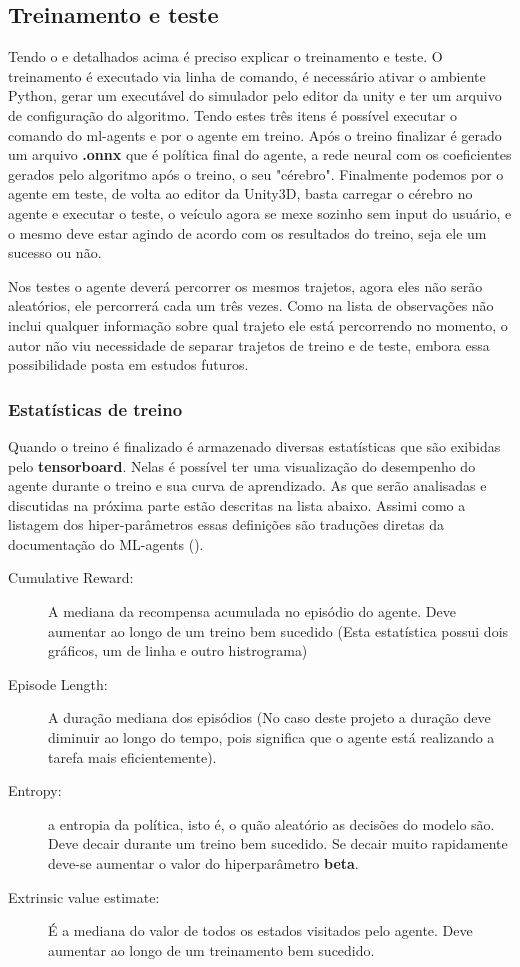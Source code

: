 \subsection{Treinamento e teste}
Tendo o  e  detalhados acima é preciso explicar o treinamento e teste. O treinamento é executado via linha de comando, é necessário ativar o ambiente Python, gerar um executável do simulador pelo editor da unity e ter um arquivo de configuração do algoritmo. Tendo estes três itens é possível executar o comando do ml-agents e por o agente em treino. Após o treino finalizar é gerado um arquivo \textbf{.onnx} que é política final do agente, a rede neural com os coeficientes gerados pelo algoritmo após o treino, o seu "cérebro". Finalmente podemos por o agente em teste, de volta ao editor da Unity3D, basta carregar o cérebro no agente e executar o teste, o veículo agora se mexe sozinho sem input do usuário, e o mesmo deve estar agindo de acordo com os resultados do treino, seja ele um sucesso ou não.

Nos testes o agente deverá percorrer os mesmos trajetos, agora eles não serão aleatórios, ele percorrerá cada um três vezes. Como na lista de observações não inclui qualquer informação sobre qual trajeto ele está percorrendo no momento, o autor não viu necessidade de separar trajetos de treino e de teste, embora essa possibilidade posta em estudos futuros.

\subsubsection*{Estatísticas de treino}
Quando o treino é finalizado é armazenado diversas estatísticas que são exibidas pelo \textbf{tensorboard}. Nelas é possível ter uma visualização do desempenho do agente durante o treino e sua curva de aprendizado. As que serão analisadas e discutidas na próxima parte estão descritas na lista abaixo. Assimi como a listagem dos hiper-parâmetros essas definições são traduções diretas da documentação do ML-agents ().

\begin{description}
   \item [Cumulative Reward:] A mediana da recompensa acumulada no episódio do agente. Deve aumentar ao longo de um treino bem sucedido (Esta estatística possui dois gráficos, um de linha e outro histrograma)
   \item [Episode Length:] A duração mediana dos episódios (No caso deste projeto a duração deve diminuir ao longo do tempo, pois significa que o agente está realizando a tarefa mais eficientemente).
   \item [Entropy:] a entropia da política, isto é, o quão aleatório as decisões do modelo são. Deve decair durante um treino bem sucedido. Se decair muito rapidamente deve-se aumentar o valor do hiperparâmetro \textbf{beta}.
   \item [Extrinsic value estimate:] É a mediana do valor de todos os estados visitados pelo agente. Deve aumentar ao longo de um treinamento bem sucedido.
\end{description}

